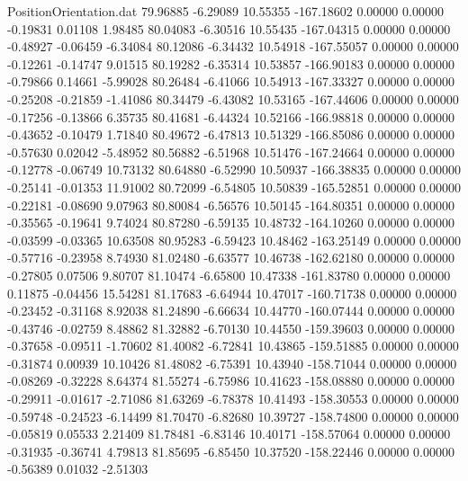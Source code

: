 \begin{filecontents}{PositionOrientation.dat}
  79.96885   -6.29089   10.55355  -167.18602    0.00000    0.00000   -0.19831    0.01108    1.98485
  80.04083   -6.30516   10.55435  -167.04315    0.00000    0.00000   -0.48927   -0.06459   -6.34084
  80.12086   -6.34432   10.54918  -167.55057    0.00000    0.00000   -0.12261   -0.14747    9.01515
  80.19282   -6.35314   10.53857  -166.90183    0.00000    0.00000   -0.79866    0.14661   -5.99028
  80.26484   -6.41066   10.54913  -167.33327    0.00000    0.00000   -0.25208   -0.21859   -1.41086
  80.34479   -6.43082   10.53165  -167.44606    0.00000    0.00000   -0.17256   -0.13866    6.35735
  80.41681   -6.44324   10.52166  -166.98818    0.00000    0.00000   -0.43652   -0.10479    1.71840
  80.49672   -6.47813   10.51329  -166.85086    0.00000    0.00000   -0.57630    0.02042   -5.48952
  80.56882   -6.51968   10.51476  -167.24664    0.00000    0.00000   -0.12778   -0.06749   10.73132
  80.64880   -6.52990   10.50937  -166.38835    0.00000    0.00000   -0.25141   -0.01353   11.91002
  80.72099   -6.54805   10.50839  -165.52851    0.00000    0.00000   -0.22181   -0.08690    9.07963
  80.80084   -6.56576   10.50145  -164.80351    0.00000    0.00000   -0.35565   -0.19641    9.74024
  80.87280   -6.59135   10.48732  -164.10260    0.00000    0.00000   -0.03599   -0.03365   10.63508
  80.95283   -6.59423   10.48462  -163.25149    0.00000    0.00000   -0.57716   -0.23958    8.74930
  81.02480   -6.63577   10.46738  -162.62180    0.00000    0.00000   -0.27805    0.07506    9.80707
  81.10474   -6.65800   10.47338  -161.83780    0.00000    0.00000    0.11875   -0.04456   15.54281
  81.17683   -6.64944   10.47017  -160.71738    0.00000    0.00000   -0.23452   -0.31168    8.92038
  81.24890   -6.66634   10.44770  -160.07444    0.00000    0.00000   -0.43746   -0.02759    8.48862
  81.32882   -6.70130   10.44550  -159.39603    0.00000    0.00000   -0.37658   -0.09511   -1.70602
  81.40082   -6.72841   10.43865  -159.51885    0.00000    0.00000   -0.31874    0.00939   10.10426
  81.48082   -6.75391   10.43940  -158.71044    0.00000    0.00000   -0.08269   -0.32228    8.64374
  81.55274   -6.75986   10.41623  -158.08880    0.00000    0.00000   -0.29911   -0.01617   -2.71086
  81.63269   -6.78378   10.41493  -158.30553    0.00000    0.00000   -0.59748   -0.24523   -6.14499
  81.70470   -6.82680   10.39727  -158.74800    0.00000    0.00000   -0.05819    0.05533    2.21409
  81.78481   -6.83146   10.40171  -158.57064    0.00000    0.00000   -0.31935   -0.36741    4.79813
  81.85695   -6.85450   10.37520  -158.22446    0.00000    0.00000   -0.56389    0.01032   -2.51303

\end{filecontents}
